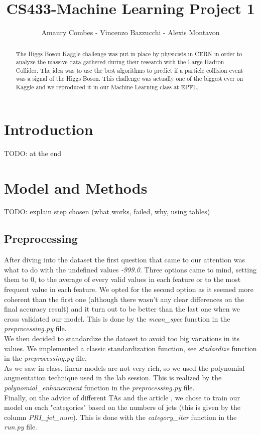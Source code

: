 \documentclass[10pt,conference,compsocconf]{IEEEtran}
\begin{document}
\title{CS433-Machine Learning Project 1}

\author{
  Amaury Combes - Vincenzo Bazzucchi - Alexis Montavon\\
}

\maketitle

\begin{abstract}
  The Higgs Boson Kaggle challenge was put in place by physicists in CERN in order to analyze the massive data gathered during their research with the Large Hadron Collider. The idea was to use the best algorithms to predict if a particle collision event was a signal of the Higgs Boson. This challenge was actually one of the biggest ever on Kaggle and we reproduced it in our Machine Learning class at EPFL.
\end{abstract}

\section{Introduction}

TODO: at the end

\section{Model and Methods}
\label{sec:model}
TODO: explain step chosen (what works, failed, why, using tables)
\subsection{Preprocessing}
After diving into the dataset the first question that came to our attention was what to do with the undefined values \textit{-999.0}. Three options came to mind, setting them to 0, to the average of every valid values in each feature or to the most frequent value in each feature. We opted for the second option as it seemed more coherent than the first one (although there wasn't any clear differences on the final accuracy result) and it turn out to be better than the last one when we cross validated our model. This is done by the \textit{mean\_spec} function in the \textit{preprocessing.py} file.\\ We then decided to standardize the dataset to avoid too big variations in its values. We implemented a classic standardization function, see \textit{stadardize} function in the \textit{preprocessing.py} file.\\ As we saw in class, linear models are not very rich, so we used the polynomial augmentation technique used in the lab session. This is realized by the \textit{polynomial\_enhancement} function in the \textit{preprocessing.py} file.\\
Finally, on the advice of different TAs and the article \cite{anderson04}, we chose to train our model on each "categories" based on the numbers of jets (this is given by the column \textit{PRI\_jet\_num}). This is done with the \textit{category\_iter} function in the \textit{run.py} file.
\end{document}
